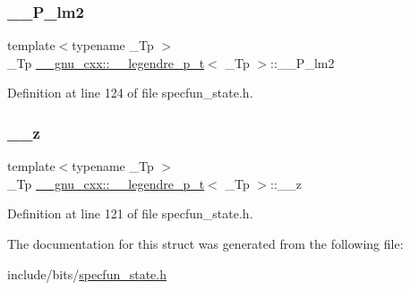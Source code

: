 \subsubsection{\texorpdfstring{\+\_\+\+\_\+\+P\+\_\+lm2}{\_\_P\_lm2}}
{\footnotesize\ttfamily template$<$typename \+\_\+\+Tp $>$ \\
\+\_\+\+Tp \hyperlink{struct____gnu__cxx_1_1____legendre__p__t}{\+\_\+\+\_\+gnu\+\_\+cxx\+::\+\_\+\+\_\+legendre\+\_\+p\+\_\+t}$<$ \+\_\+\+Tp $>$\+::\+\_\+\+\_\+\+P\+\_\+lm2}



Definition at line 124 of file specfun\+\_\+state.\+h.

\mbox{\label{struct____gnu__cxx_1_1____legendre__p__t_ad1ee2ca27099d0f3c75220247a0779f6}} 
\subsubsection{\texorpdfstring{\+\_\+\+\_\+z}{\_\_z}}
{\footnotesize\ttfamily template$<$typename \+\_\+\+Tp $>$ \\
\+\_\+\+Tp \hyperlink{struct____gnu__cxx_1_1____legendre__p__t}{\+\_\+\+\_\+gnu\+\_\+cxx\+::\+\_\+\+\_\+legendre\+\_\+p\+\_\+t}$<$ \+\_\+\+Tp $>$\+::\+\_\+\+\_\+z}



Definition at line 121 of file specfun\+\_\+state.\+h.



The documentation for this struct was generated from the following file\+:\begin{DoxyCompactItemize}
\item 
include/bits/\hyperlink{specfun__state_8h}{specfun\+\_\+state.\+h}\end{DoxyCompactItemize}
